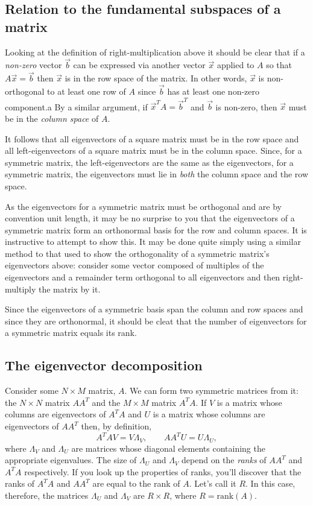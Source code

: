 \documentclass[a4paper]{article}
\newcommand{\highlight}[1]{{\color{blue}#1}}
\begin{document}
\subsection{Relation to the fundamental subspaces of a matrix}

Looking at the definition of right-multiplication above it should be clear that
if a \emph{non-zero} vector $\vec{b}$ can be expressed via another vector
$\vec{x}$ applied to $A$ so that $A\vec{x} = \vec{b}$ then $\vec{x}$ is in the
row space of the matrix. In other words, $\vec{x}$ is non-orthogonal to at
least one row of $A$ since $\vec{b}$ has at least one non-zero component.a
By a similar argument, if $\vec{x}^T A = \vec{b}^T$ and $\vec{b}$ is non-zero,
then $\vec{x}$ must be in the \emph{column space} of $A$.

It follows that \highlight{all eigenvectors of a square matrix must be in the
row space} and \highlight{all left-eigenvectors of a square matrix must be in
the column space}. Since, for a symmetric matrix, the left-eigenvectors are the
same as the eigenvectors, \highlight{for a symmetric matrix, the eigenvectors
must lie in \emph{both} the column space and the row space}.

As the eigenvectors for a symmetric matrix must be orthogonal and are by
convention unit length, it may be no surprise to you that \highlight{the
eigenvectors of a symmetric matrix form an orthonormal basis for the row and
column spaces}. It is instructive to attempt to show this. It may be done quite
simply using a similar method to that used to show the orthogonality of
a symmetric matrix's eigenvectors above: consider some vector composed of
multiples of the eigenvectors and a remainder term orthogonal to all
eigenvectors and then right-multiply the matrix by it.

Since the eigenvectors of a symmetric basis span the column and row spaces and
since they are orthonormal, it should be cleat that \highlight{the number of
eigenvectors for a symmetric matrix equals its rank}.

\subsection{The eigenvector decomposition}

Consider some $N \times M$ matrix, $A$. We can form two symmetric matrices from
it: the $N \times N$ matrix $AA^T$ and the $M \times M$ matrix $A^TA$. If $V$ is
a matrix whose columns are eigenvectors of $A^TA$ and $U$ is a matrix whose
columns are eigenvectors of $AA^T$ then, by definition,
\[
  A^TA V = V \Lambda_V, \qquad AA^T U = U \Lambda_U,
\]
where $\Lambda_V$ and $\Lambda_U$ are matrices whose diagonal elements
containing the appropriate eigenvalues. The size of $\Lambda_U$ and $\Lambda_V$
depend on the \emph{ranks} of $AA^T$ and $A^TA$ respectively. If you look up the
properties of ranks, you'll discover that the ranks of $A^TA$ and $AA^T$ are
equal to the rank of $A$. Let's call it $R$. In this case, therefore,
\highlight{the matrices $\Lambda_U$ and $\Lambda_V$ are $R \times R$, where $R =
\mbox{rank}(A)$}.
\end{document}
